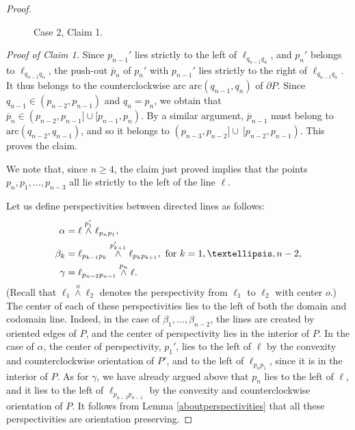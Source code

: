 \documentclass[11pt]{amsart}
\theoremstyle{remark}
\numberwithin{equation}{section}
\newcommand{\arc}{\mathrm{arc}}
\renewcommand{\geq}{\geqslant}
\begin{document}
\begin{proof}
\begin{figure}[h]


\caption{Case 2, Claim 1.}
\label{figCase2Claim1}
\end{figure}

{\it Proof of Claim 1.} Since $p_{n-1}'$ lies strictly to the left of $\ell_{q_{n-1}q_n}$, and $p_n'$ belongs to $\ell_{q_{n-1}q_n}$, the push-out $\overline p_n$ of $p_n'$ with  $p_{n-1}'$ lies strictly to the right of  $\ell_{q_{n-1}q_n}$. It thus belongs to the counterclockwise arc $\arc(q_{n-1},q_n)$ of $\partial P$. Since $q_{n-1}\in (p_{n-2},p_{n-1})$ and $q_n=p_n$, we obtain that  $\overline p_n\in (p_{n-2} ,p_{n-1}]\cup [p_{n-1},p_n)$. By a similar argument,  $\overline p_{n-1}$ must belong to $\arc(q_{n-2},q_{n-1})$, and so it belongs to $(p_{n-3},p_{n-2}]\cup\ [p_{n-2},p_{n-1})$. This proves the claim.

 

We note that, since $n\geq 4$, the claim  just proved implies that the points $p_n,p_1,\ldots,p_{n-3}$ all lie strictly  to the left of the line $\ell$.

Let us define perspectivities between directed lines as follows: 
\begin{align*}
\alpha &=\ell\stackrel{p_1'}{\wedge}\ell_{p_np_1},\\
\beta_k &=\ell_{p_{k-1}p_k}\stackrel{p_{k+1}'}{\wedge}\ell_{p_kp_{k+1}},\hbox{ for }k=1,\ldots,n-2,\\
\gamma &=\ell_{p_{n-2}p_{n-1}}\stackrel{p_n}{\wedge}\ell.
\end{align*}
(Recall that $\ell_1\stackrel{o}{\wedge} \ell_2$ denotes the perspectivity from $\ell_1$ to $\ell_2$ with center $o$.) The center of  each of these perspectivities lies to the left of both the domain and codomain line. Indeed, in the case of $\beta_1,\ldots,\beta_{n-2}$,   the lines are created by oriented edges of $P$, and the center of perspectivity lies in the interior of $P$. In the case of $\alpha$, the center of perspectivity, $p_1'$, lies to the left of $\ell$ by the convexity and counterclockwise orientation of $P'$, and to the left of $\ell_{p_np_1}$, since it is in the interior of $P$. As for $\gamma$, we have already argued above that $p_n$ lies to the left of $\ell$, and it lies to the left of $\ell_{p_{n-2}p_{n-1}}$ by the convexity and counterclockwise orientation of $P$. It follows from  Lemma \ref{aboutperspectivities} that all these perspectivities are orientation preserving. 


\end{proof}
\end{document}
